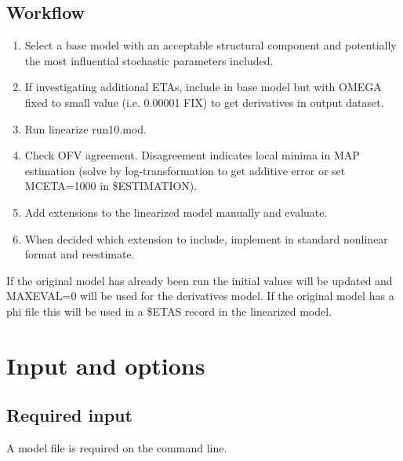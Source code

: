 \subsection{Workflow}
\begin{enumerate}
\item Select a base model with an acceptable structural component and potentially the most influential stochastic parameters included.
\item If investigating additional ETAs, include in base model but with OMEGA fixed to small value (i.e. 0.00001 FIX) to get derivatives in output dataset.
\item Run linearize run10.mod.
\item Check OFV agreement. Disagreement indicates local minima in MAP estimation (solve by log-transformation to get additive error or set MCETA=1000 in \$ESTIMATION).
\item Add extensions to the linearized model manually and evaluate.
\item When decided which extension to include, implement in standard nonlinear format and reestimate.
\end{enumerate}

If the original model has already been run the initial values will be updated and MAXEVAL=0 will be used for the derivatives model.
If the original model has a phi file this will be used in a \$ETAS record in the linearized model.

\section{Input and options}
\subsection{Required input}
A model file is required on the command line.

